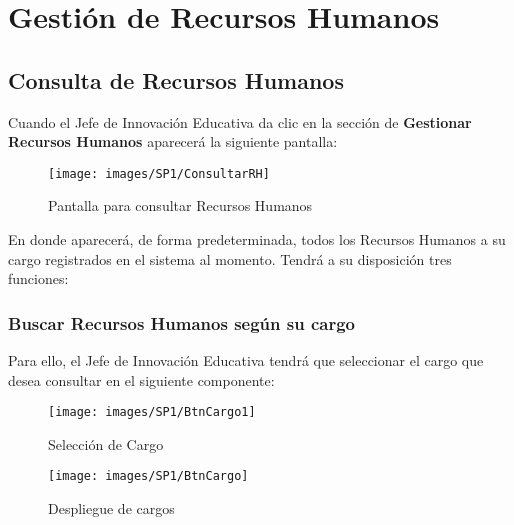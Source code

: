 
\chapter{Gestión de Recursos Humanos}
    \section{Consulta de Recursos Humanos}
        Cuando el Jefe de Innovación Educativa da clic en la sección de \textbf{Gestionar Recursos Humanos} aparecerá la siguiente pantalla:
        
        
        \begin{figure}[!hbtp]
        	\centering
        	\hypertarget{consultarrh}{\texttt{[image: images/SP1/ConsultarRH]}}
        	\caption{Pantalla para consultar Recursos Humanos}
        	\label{consultarrh}
        \end{figure}

        En donde aparecerá, de forma predeterminada, todos los Recursos Humanos a su cargo registrados en el sistema al momento. Tendrá a su disposición tres funciones:

    	\subsection{Buscar Recursos Humanos según su cargo}
        
        	Para ello, el Jefe de Innovación Educativa tendrá que seleccionar el cargo que desea consultar en el siguiente componente:
        
        	\begin{figure}[!hbtp]
        		\centering
        		\hypertarget{cargo1}{\texttt{[image: images/SP1/BtnCargo1]}}
        		\caption{Selección de Cargo}
        		\label{cargo1}
        	\end{figure}

        	\begin{figure}[!hbtp]
        		\centering
        		\hypertarget{cargo}{\texttt{[image: images/SP1/BtnCargo]}}
        		\caption{Despliegue de cargos}
        		\label{cargo}
        	\end{figure}
        
